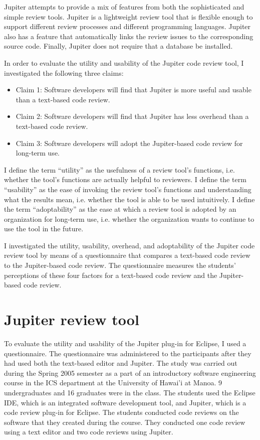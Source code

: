 Jupiter attempts to provide a mix of features from both the sophisticated and simple review tools. Jupiter is a lightweight review tool that is flexible enough to support different review processes and different programming languages. Jupiter also has a feature that automatically links the review issues to the corresponding source code. Finally, Jupiter does not require that a database be installed.

In order to evaluate the utility and usability of the Jupiter code review tool, I investigated the following three claims:

\begin{itemize}
	\item Claim 1: Software developers will find that Jupiter is more useful and usable than a text-based code review.
	\item Claim 2: Software developers will find that Jupiter has less overhead than a text-based code review.
	\item Claim 3: Software developers will adopt the Jupiter-based code review for long-term use.
\end{itemize}

I define the term ``utility'' as the usefulness of a review tool's functions, i.e. whether the tool's functions are actually helpful to reviewers. I define the term ``usability'' as the ease of invoking the review tool's functions and understanding what the results mean, i.e. whether the tool is able to be used intuitively. I define the term ``adoptability'' as the ease at which a review tool is adopted by an organization for long-term use, i.e. whether the organization wants to continue to use the tool in the future.
 
I investigated the utility, usability, overhead, and adoptability of the Jupiter code review tool by means of a questionnaire that compares a text-based code review to the Jupiter-based code review. The questionnaire measures the students' perceptions of these four factors for a text-based code review and the Jupiter-based code review.

\section{Jupiter review tool}
\label{sec:jupiter-review-tool}

To evaluate the utility and usability of the Jupiter plug-in for Eclipse, I used a questionnaire. The questionnaire was administered to the participants after they had used both the text-based editor and Jupiter. The study was carried out during the Spring 2005 semester as a part of an introductory software engineering course in the ICS department at the University of Hawai'i at Manoa. 9 undergraduates and 16 graduates were in the class. The students used the Eclipse IDE, which is an integrated software development tool, and Jupiter, which is a code review plug-in for Eclipse. The students conducted code reviews on the software that they created during the course. They conducted one code review using a text editor and two code reviews using Jupiter.

